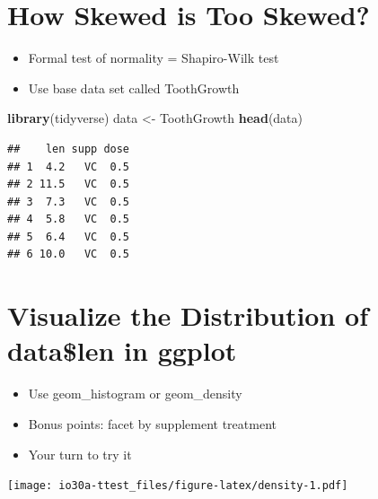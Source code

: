 \documentclass[
]{book}
\newenvironment{Shaded}{\begin{snugshade}}{\end{snugshade}}
\newcommand{\CommentTok}[1]{\textcolor[rgb]{0.56,0.35,0.01}{\textit{#1}}}
\newcommand{\DataTypeTok}[1]{\textcolor[rgb]{0.13,0.29,0.53}{#1}}
\newcommand{\KeywordTok}[1]{\textcolor[rgb]{0.13,0.29,0.53}{\textbf{#1}}}
\newcommand{\NormalTok}[1]{#1}
\newcommand{\OperatorTok}[1]{\textcolor[rgb]{0.81,0.36,0.00}{\textbf{#1}}}
\newcommand{\StringTok}[1]{\textcolor[rgb]{0.31,0.60,0.02}{#1}}
\providecommand{\tightlist}{%
  \setlength{\itemsep}{0pt}\setlength{\parskip}{0pt}}
\begin{document}
\hypertarget{how-skewed-is-too-skewed-1}{%
\section{How Skewed is Too Skewed?}\label{how-skewed-is-too-skewed-1}}

\begin{itemize}
\tightlist
\item
  Formal test of normality = Shapiro-Wilk test
\item
  Use base data set called ToothGrowth
\end{itemize}

\begin{Shaded}
\begin{Highlighting}[]
\KeywordTok{library}\NormalTok{(tidyverse)}
\NormalTok{data <-}\StringTok{ }\NormalTok{ToothGrowth}
\KeywordTok{head}\NormalTok{(data)}
\end{Highlighting}
\end{Shaded}

\begin{verbatim}
##    len supp dose
## 1  4.2   VC  0.5
## 2 11.5   VC  0.5
## 3  7.3   VC  0.5
## 4  5.8   VC  0.5
## 5  6.4   VC  0.5
## 6 10.0   VC  0.5
\end{verbatim}

\hypertarget{visualize-the-distribution-of-datalen-in-ggplot-2}{%
\section{Visualize the Distribution of data\$len in ggplot}\label{visualize-the-distribution-of-datalen-in-ggplot-2}}

\begin{itemize}
\tightlist
\item
  Use geom\_histogram or geom\_density
\item
  Bonus points: facet by supplement treatment
\item
  Your turn to try it
\end{itemize}

\texttt{[image: io30a-ttest\_files/figure-latex/density-1.pdf]}

\begin{Shaded}
\end{Shaded}
\end{document}
